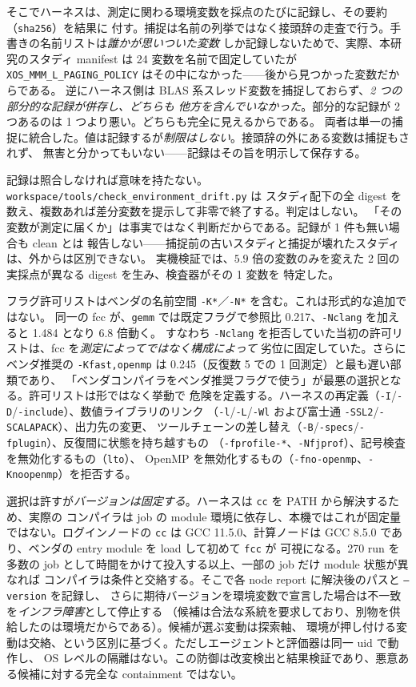\documentclass[conference,letterpaper]{IEEEtran}
\begin{document}
そこでハーネスは、測定に関わる環境変数を採点のたびに記録し、その要約（\texttt{sha256}）を結果に
付す。捕捉は名前の列挙ではなく接頭辞の走査で行う。手書きの名前リストは\emph{誰かが思いついた変数}
しか記録しないためで、実際、本研究のスタディ manifest は 24 変数を名前で固定していたが
\texttt{XOS\_MMM\_L\_PAGING\_POLICY} はその中になかった——後から見つかった変数だからである。
逆にハーネス側は BLAS 系スレッド変数を捕捉しておらず、\emph{2 つの部分的な記録が併存し、どちらも
他方を含んでいなかった}。部分的な記録が 2 つあるのは 1 つより悪い。どちらも完全に見えるからである。
両者は単一の捕捉に統合した。値は記録するが\emph{制限はしない}。接頭辞の外にある変数は捕捉もされず、
無害と分かってもいない——記録はその旨を明示して保存する。

記録は照合しなければ意味を持たない。\texttt{workspace/tools/check\_environment\_drift.py} は
スタディ配下の全 digest を数え、複数あれば差分変数を提示して非零で終了する。判定はしない。
「その変数が測定に届くか」は事実ではなく判断だからである。記録が 1 件も無い場合も clean とは
報告しない——捕捉前の古いスタディと捕捉が壊れたスタディは、外からは区別できない。
実機検証では、$5.9$ 倍の変数のみを変えた 2 回の実採点が異なる digest を生み、検査器がその 1 変数を
特定した。

フラグ許可リストはベンダの名前空間 \texttt{-K*}／\texttt{-N*} を含む。これは形式的な追加ではない。
同一の fcc が、\texttt{gemm} では既定フラグで参照比 0.217、\texttt{-Nclang} を加えると 1.484 となり 6.8 倍動く。
すなわち \texttt{-Nclang} を拒否していた当初の許可リストは、fcc を\emph{測定によってではなく構成によって}
劣位に固定していた。さらにベンダ推奨の \texttt{-Kfast,openmp} は 0.245（反復数 5 での 1 回測定）と最も遅い部類であり、
「ベンダコンパイラをベンダ推奨フラグで使う」が最悪の選択となる。許可リストは形ではなく挙動で
危険を定義する。ハーネスの再定義（\texttt{-I}/\texttt{-D}/\texttt{-include}）、数値ライブラリのリンク
（\texttt{-l}/\texttt{-L}/\texttt{-Wl} および富士通 \texttt{-SSL2}/\texttt{-SCALAPACK}）、出力先の変更、
ツールチェーンの差し替え（\texttt{-B}/\texttt{-specs}/\texttt{-fplugin}）、反復間に状態を持ち越すもの
（\texttt{-fprofile-*}、\texttt{-Nfjprof}）、記号検査を無効化するもの（\texttt{lto}）、
OpenMP を無効化するもの（\texttt{-fno-openmp}、\texttt{-Knoopenmp}）を拒否する。

選択は許すが\emph{バージョンは固定する}。ハーネスは \texttt{cc} を PATH から解決するため、実際の
コンパイラは job の module 環境に依存し、本機ではこれが固定量ではない。ログインノードの \texttt{cc} は
GCC 11.5.0、計算ノードは GCC 8.5.0 であり、ベンダの entry module を load して初めて \texttt{fcc} が
可視になる。270 run を多数の job として時間をかけて投入する以上、一部の job だけ module 状態が異なれば
コンパイラは条件と交絡する。そこで各 node report に解決後のパスと \texttt{--version} を記録し、
さらに期待バージョンを環境変数で宣言した場合は不一致を\emph{インフラ障害}として停止する
（候補は合法な系統を要求しており、別物を供給したのは環境だからである）。候補が選ぶ変動は探索軸、
環境が押し付ける変動は交絡、という区別に基づく。ただしエージェントと評価器は同一 uid で動作し、
OS レベルの隔離はない。この防御は改変検出と結果検証であり、悪意ある候補に対する完全な containment ではない。
\end{document}
